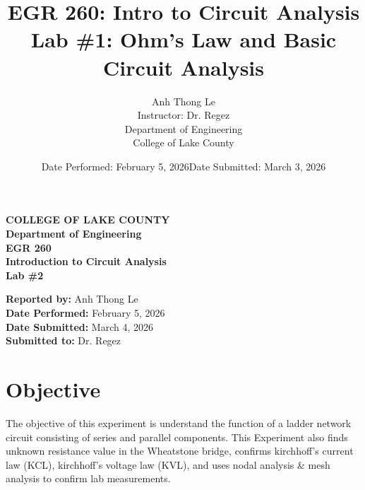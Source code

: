 \documentclass[12pt]{article}
\begin{document}
\begin{titlepage}
    \centering

    \vspace*{1in}

    \textbf{\Large COLLEGE OF LAKE COUNTY} \\[0.2in]

    \textbf{\large Department of Engineering} \\[0.6in]

    \textbf{\Large EGR 260} \\
    \textbf{\large Introduction to Circuit Analysis} \\[0.6in]

    \textbf{\Large Lab \#2} \\[0.2in]


    \begin{center}
            \textbf{Reported by:} Anh Thong Le \\[0.15in]
    \textbf{Date Performed:} February 5, 2026 \\[0.15in]
    \textbf{Date Submitted:} March 4, 2026 \\[0.15in]
    \textbf{Submitted to:} Dr. Regez
    \end{center}
        

    \vfill
\end{titlepage}


\title{\textbf{EGR 260: Intro to Circuit Analysis}\\
Lab \#1: Ohm's Law and Basic Circuit Analysis}
\author{
Anh Thong Le \\
Instructor: Dr. Regez \\
Department of Engineering \\
College of Lake County
}
\date{Date Performed: February 5, 2026\quad Date Submitted: March 3, 2026}

\section{Objective}
The objective of this experiment is understand the function of a ladder network circuit consisting of series and parallel components. This Experiment also finds unknown resistance value in the Wheatstone bridge, confirms kirchhoff's current law (KCL), kirchhoff's voltage law (KVL), and uses nodal analysis \& mesh analysis to confirm lab measurements. 

\end{document}
